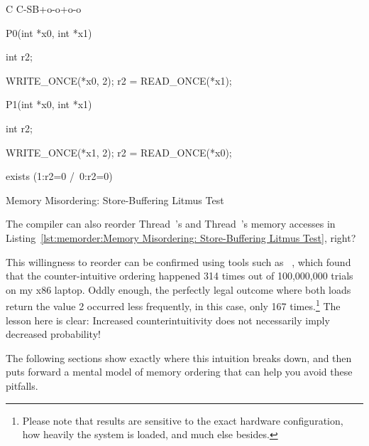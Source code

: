 \begin{listing}[tbp]
{ \scriptsize
\begin{verbbox}[\LstLineNo]
C C-SB+o-o+o-o
{
}

P0(int *x0, int *x1)
{
  int r2;

  WRITE_ONCE(*x0, 2);
  r2 = READ_ONCE(*x1);
}


P1(int *x0, int *x1)
{
  int r2;

  WRITE_ONCE(*x1, 2);
  r2 = READ_ONCE(*x0);
}

exists (1:r2=0 /\ 0:r2=0)
\end{verbbox}
}
\centering
\theverbbox
\caption{Memory Misordering: Store-Buffering Litmus Test}
\label{lst:memorder:Memory Misordering: Store-Buffering Litmus Test}
\end{listing}

\QuickQuiz{}
	The compiler can also reorder Thread~'s and
	Thread~'s memory accesses in
	Listing~\ref{lst:memorder:Memory Misordering: Store-Buffering Litmus Test},
	right?
 \QuickQuizEnd

This willingness to reorder can be confirmed using tools such as
~\cite{Alglave:2014:HCM:2594291.2594347},
which found that the counter-intuitive ordering happened
314 times out of 100,000,000 trials on my x86 laptop.
Oddly enough, the perfectly legal outcome where both loads return the
value 2 occurred less frequently, in this case, only 167 times.\footnote{
	Please note that results are sensitive to the exact hardware
	configuration,
	how heavily the system is loaded, and much else besides.}
The lesson here is clear: Increased counterintuitivity does not necessarily
imply decreased probability!

The following sections show exactly where this intuition breaks down,
and then puts forward a mental model of memory ordering that can help
you avoid these pitfalls.

